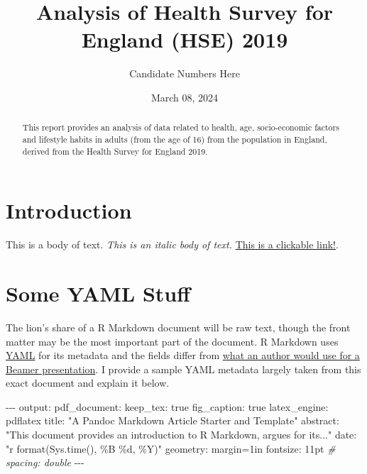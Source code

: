 \documentclass[
  11pt,
]{article}
\title{Analysis of Health Survey for England (HSE) 2019}
\author{Candidate Numbers Here}
\date{March 08, 2024}
\newenvironment{Shaded}{\begin{snugshade}}{\end{snugshade}}
\newcommand{\CommentTok}[1]{\textcolor[rgb]{0.56,0.35,0.01}{\textit{#1}}}
\newcommand{\NormalTok}[1]{#1}
\newcommand{\OtherTok}[1]{\textcolor[rgb]{0.56,0.35,0.01}{#1}}
\newcommand{\SpecialCharTok}[1]{\textcolor[rgb]{0.00,0.00,0.00}{#1}}
\newcommand{\StringTok}[1]{\textcolor[rgb]{0.31,0.60,0.02}{#1}}
\begin{document}
\maketitle
\begin{abstract}
This report provides an analysis of data related to health, age,
socio-economic factors and lifestyle habits in adults (from the age of
16) from the population in England, derived from the Health Survey for
England 2019.
\end{abstract}

\newpage

\hypertarget{introduction}{%
\section{Introduction}\label{introduction}}

This is a body of text. \emph{This is an italic body of text.}
\href{https://google.com}{This is a clickable link!}.

\hypertarget{some-yaml-stuff}{%
\section{Some YAML Stuff}\label{some-yaml-stuff}}

The lion's share of a R Markdown document will be raw text, though the
front matter may be the most important part of the document. R Markdown
uses \href{http://www.yaml.org/}{YAML} for its metadata and the fields
differ from
\href{http://svmiller.com/blog/2015/02/moving-from-beamer-to-r-markdown/}{what
an author would use for a Beamer presentation}. I provide a sample YAML
metadata largely taken from this exact document and explain it below.

\begin{Shaded}
\begin{Highlighting}[]
\SpecialCharTok{{-}{-}{-}}
\NormalTok{output}\SpecialCharTok{:} 
\NormalTok{  pdf\_document}\SpecialCharTok{:}
\NormalTok{    keep\_tex}\SpecialCharTok{:}\NormalTok{ true}
\NormalTok{    fig\_caption}\SpecialCharTok{:}\NormalTok{ true}
\NormalTok{    latex\_engine}\SpecialCharTok{:}\NormalTok{ pdflatex}
\NormalTok{title}\SpecialCharTok{:} \StringTok{"A Pandoc Markdown Article Starter and Template"}
\NormalTok{abstract}\SpecialCharTok{:} \StringTok{"This document provides an introduction to R Markdown, argues for its..."}
\NormalTok{date}\SpecialCharTok{:} \StringTok{"\textasciigrave{}r format(Sys.time(), \textquotesingle{}\%B \%d, \%Y\textquotesingle{})\textasciigrave{}"}
\NormalTok{geometry}\SpecialCharTok{:}\NormalTok{ margin}\OtherTok{=}\NormalTok{1in}
\NormalTok{fontsize}\SpecialCharTok{:}\NormalTok{ 11pt}
\CommentTok{\# spacing: double}
\SpecialCharTok{{-}{-}{-}}
\end{Highlighting}
\end{Shaded}
\end{document}
